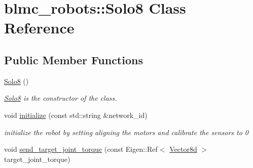 \hypertarget{classblmc__robots_1_1Solo8}{}\section{blmc\+\_\+robots\+:\+:Solo8 Class Reference}
\label{classblmc__robots_1_1Solo8}
\subsection*{Public Member Functions}
\begin{DoxyCompactItemize}
\item 
\hyperlink{classblmc__robots_1_1Solo8_ab37c2e406f12685fcb4e09086ee7c0c0}{Solo8} ()
\begin{DoxyCompactList}\small\item\em \hyperlink{classblmc__robots_1_1Solo8}{Solo8} is the constructor of the class. \end{DoxyCompactList}\item 
void \hyperlink{classblmc__robots_1_1Solo8_a7016486ea321d63f2659b5efba4dd78a}{initialize} (const std\+::string \&network\+\_\+id)\hypertarget{classblmc__robots_1_1Solo8_a7016486ea321d63f2659b5efba4dd78a}{}\label{classblmc__robots_1_1Solo8_a7016486ea321d63f2659b5efba4dd78a}

\begin{DoxyCompactList}\small\item\em initialize the robot by setting aligning the motors and calibrate the sensors to 0 \end{DoxyCompactList}\item 
void \hyperlink{classblmc__robots_1_1Solo8_aa743eac2996bd33c86e23bd2029c3a01}{send\+\_\+target\+\_\+joint\+\_\+torque} (const Eigen\+::\+Ref$<$ \hyperlink{common__header_8hpp_a98975ffbe0bca1296078e0350dfedd60}{Vector8d} $>$ target\+\_\+joint\+\_\+torque)\hypertarget{classblmc__robots_1_1Solo8_aa743eac2996bd33c86e23bd2029c3a01}{}\label{classblmc__robots_1_1Solo8_aa743eac2996bd33c86e23bd2029c3a01}


\end{DoxyCompactItemize}
